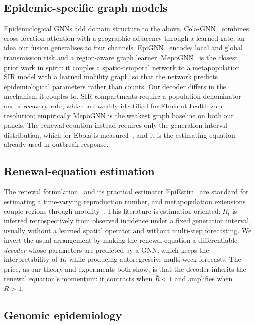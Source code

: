 \subsection{Epidemic-specific graph models}

Epidemiological GNNs add domain structure to the above. Cola-GNN~\cite{colagnn} combines cross-location attention with a geographic adjacency through a learned gate, an idea our fusion generalises to four channels. EpiGNN~\cite{epignn} encodes local and global transmission risk and a region-aware graph learner. MepoGNN~\cite{mepognn} is the closest prior work in spirit: it couples a spatio-temporal network to a metapopulation SIR model with a learned mobility graph, so that the network predicts epidemiological parameters rather than counts. Our decoder differs in the mechanism it couples to. SIR compartments require a population denominator and a recovery rate, which are weakly identified for Ebola at health-zone resolution; empirically MepoGNN is the weakest graph baseline on both our panels. The renewal equation instead requires only the generation-interval distribution, which for Ebola is measured~\cite{who2014}, and it is the estimating equation already used in outbreak response.

\subsection{Renewal-equation estimation}

The renewal formulation~\cite{fraser2007} and its practical estimator EpiEstim~\cite{cori2013} are standard for estimating a time-varying reproduction number, and metapopulation extensions couple regions through mobility~\cite{riley2007}. This literature is estimation-oriented: $R_t$ is inferred retrospectively from observed incidence under a fixed generation interval, usually without a learned spatial operator and without multi-step forecasting. We invert the usual arrangement by making the renewal equation a differentiable \emph{decoder} whose parameters are predicted by a GNN, which keeps the interpretability of $R_t$ while producing autoregressive multi-week forecasts. The price, as our theory and experiments both show, is that the decoder inherits the renewal equation's momentum: it contracts when $\bar R<1$ and amplifies when $\bar R>1$.

\subsection{Genomic epidemiology}


